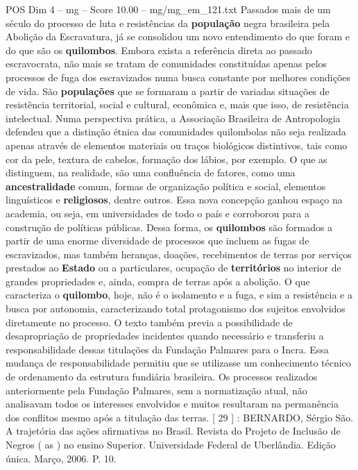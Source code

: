 \begin{textsample}{POS Dim 4 – mg – Score 10.00 – mg/mg\_em\_121.txt}
Passados mais de um século do processo de luta e resistências da \textbf{população} negra brasileira pela Abolição da Escravatura, já se consolidou um novo entendimento do que foram e do que são os \textbf{quilombos}.
Embora exista a referência direta ao passado escravocrata, não mais se tratam de comunidades constituídas apenas pelos processos de fuga dos escravizados numa busca constante por melhores condições de vida.
São \textbf{populações} que se formaram a partir de variadas situações de resistência territorial, social e cultural, econômica e, mais que isso, de resistência intelectual.
Numa perspectiva prática, a Associação Brasileira de Antropologia defendeu que a distinção étnica das comunidades quilombolas não seja realizada apenas através de elementos materiais ou traços biológicos distintivos, tais como cor da pele, textura de cabelos, formação dos lábios, por exemplo.
O que as distinguem, na realidade, são uma confluência de fatores, como uma \textbf{ancestralidade} comum, formas de organização política e social, elementos linguísticos e \textbf{religiosos}, dentre outros.
Essa nova concepção ganhou espaço na academia, ou seja, em universidades de todo o país e corroborou para a construção de políticas públicas.
Dessa forma, os \textbf{quilombos} são formados a partir de uma enorme diversidade de processos que incluem as fugas de escravizados, mas também heranças, doações, recebimentos de terras por serviços prestados ao \textbf{Estado} ou a particulares, ocupação de \textbf{territórios} no interior de grandes propriedades e, ainda, compra de terras após a abolição.
O que caracteriza o \textbf{quilombo}, hoje, não é o isolamento e a fuga, e sim a resistência e a busca por autonomia, caracterizando total protagonismo dos sujeitos envolvidos diretamente no processo.
O texto também previa a possibilidade de desapropriação de propriedades incidentes quando necessário e transferiu a responsabilidade dessas titulações da Fundação Palmares para o Incra.
Essa mudança de responsabilidade permitiu que se utilizasse um conhecimento técnico de ordenamento da estrutura fundiária brasileira.
Os processos realizados anteriormente pela Fundação Palmares, sem a normatização atual, não analisavam todos os interesses envolvidos e muitos resultaram na permanência dos conflitos mesmo após a titulação das terras. [ 29 ] : BERNARDO, Sérgio São.
A trajetória das ações afirmativas no Brasil.
Revista do Projeto de Inclusão de Negros ( as ) no ensino Superior.
Universidade Federal de Uberlândia.
Edição única.
Março, 2006.
P. 10.

\end{textsample}
